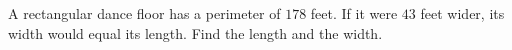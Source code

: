 A rectangular dance floor has a perimeter of $178$ feet. If it were $43$ feet wider, its width would equal its length. Find the length and the width.
